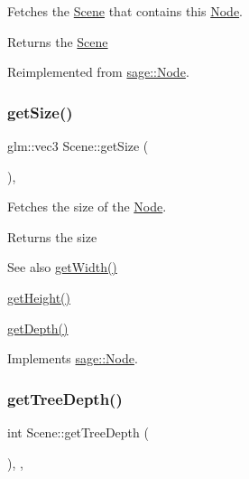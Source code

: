Fetches the \mbox{\hyperlink{classsage_1_1Scene}{Scene}} that contains this \mbox{\hyperlink{classsage_1_1Node}{Node}}. 

\begin{DoxyReturn}{Returns}
the \mbox{\hyperlink{classsage_1_1Scene}{Scene}} 
\end{DoxyReturn}


Reimplemented from \mbox{\hyperlink{classsage_1_1Node_aba969bc78f15ce97c09011b35f61b651}{sage\+::\+Node}}.

\mbox{\label{classsage_1_1Scene_aebf891e256b5ca03ffef8903eb1c63e4}} 
\subsubsection{\texorpdfstring{getSize()}{getSize()}}
{\footnotesize\ttfamily glm\+::vec3 Scene\+::get\+Size (\begin{DoxyParamCaption}{ }\end{DoxyParamCaption})\hspace{0.3cm}{\ttfamily [override]}, {\ttfamily [virtual]}}



Fetches the size of the \mbox{\hyperlink{classsage_1_1Node}{Node}}. 

\begin{DoxyReturn}{Returns}
the size 
\end{DoxyReturn}
\begin{DoxySeeAlso}{See also}
\mbox{\hyperlink{classsage_1_1Node_a65163ffabcfe9f482282ea37ead6fc5f}{get\+Width()}} 

\mbox{\hyperlink{classsage_1_1Node_a6af5a8378ac8d2c3490adbc2a03f1247}{get\+Height()}} 

\mbox{\hyperlink{classsage_1_1Node_a5c4c28939c7adf7e4a65dbb02c0cbcd3}{get\+Depth()}} 
\end{DoxySeeAlso}


Implements \mbox{\hyperlink{classsage_1_1Node_ad14a04d08b5261c27d3080f6a5e12836}{sage\+::\+Node}}.

\mbox{\label{classsage_1_1Scene_ae1a853d0cba5d20d1f25b05c9a3f89d1}} 
\subsubsection{\texorpdfstring{getTreeDepth()}{getTreeDepth()}}
{\footnotesize\ttfamily int Scene\+::get\+Tree\+Depth (\begin{DoxyParamCaption}{ }\end{DoxyParamCaption})\hspace{0.3cm}{\ttfamily [override]}, {\ttfamily [protected]}, {\ttfamily [virtual]}}



